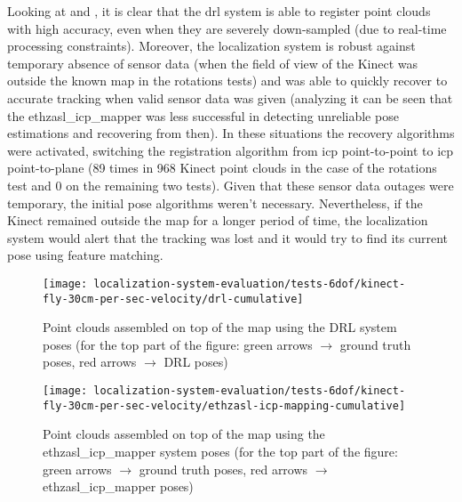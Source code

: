 Looking at  and , it is clear that the \gls{drl} system is able to register point clouds with high accuracy, even when they are severely down-sampled (due to real-time processing constraints). Moreover, the localization system is robust against temporary absence of sensor data (when the field of view of the Kinect was outside the known map in the rotations tests) and was able to quickly recover to accurate tracking when valid sensor data was given (analyzing  it can be seen that the ethzasl\_icp\_mapper was less successful in detecting unreliable pose estimations and recovering from then). In these situations the recovery algorithms were activated, switching the registration algorithm from \gls{icp} point-to-point to \gls{icp} point-to-plane (89 times in 968 Kinect point clouds in the case of the rotations test and 0 on the remaining two tests). Given that these sensor data outages were temporary, the initial pose algorithms weren't necessary. Nevertheless, if the Kinect remained outside the map for a longer period of time, the localization system would alert that the tracking was lost and it would try to find its current pose using feature matching.

\begin{figure}[H]
	\centering
	\texttt{[image: localization-system-evaluation/tests-6dof/kinect-fly-30cm-per-sec-velocity/drl-cumulative]}
	\caption{Point clouds assembled on top of the map using the DRL system poses (for the top part of the figure: green arrows $\rightarrow$ ground truth poses, red arrows $\rightarrow$ DRL poses)}
	\label{fig:localization-system-evaluation_kinect-fly-30cm-per-sec-velocity-drl-cumulative}
\end{figure}

\begin{figure}[H]
	\centering
	\texttt{[image: localization-system-evaluation/tests-6dof/kinect-fly-30cm-per-sec-velocity/ethzasl-icp-mapping-cumulative]}
	\caption{Point clouds assembled on top of the map using the ethzasl\_icp\_mapper system poses (for the top part of the figure: green arrows $\rightarrow$ ground truth poses, red arrows $\rightarrow$ ethzasl\_icp\_mapper poses)}
	\label{fig:localization-system-evaluation_kinect-fly-30cm-per-sec-velocity-ethzasl-icp-mapping-cumulative}
\end{figure}

